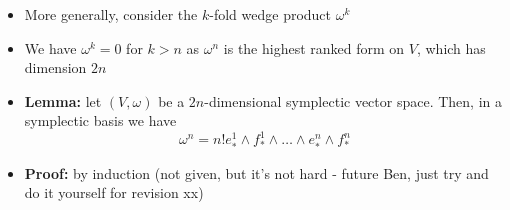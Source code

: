 \documentclass[12pt,a4paper]{article}
\numberwithin{equation}{section}
\begin{document}
\begin{itemize}
\begin{equation}
		\end{equation}
		\item More generally, consider the $k$-fold wedge product $\omega^{k}$
		\item We have $\omega^{k}=0$ for $k>n$ as $\omega^{n}$ is the highest ranked form on $V$, which has dimension $2n$
		\item \textbf{Lemma:} let $(V,\omega)$ be a $2n$-dimensional symplectic vector space. Then, in a symplectic basis we have
		\begin{equation}
			\omega^{n}=n!e_{*}^{1}\wedge f_{*}^{1}\wedge\ldots\wedge e_{*}^{n}\wedge f_{*}^{n}
		\end{equation}
		\item \textbf{Proof:} by induction (not given, but it's not hard - future Ben, just try and do it yourself for revision xx)
	\end{itemize}
\end{document}
